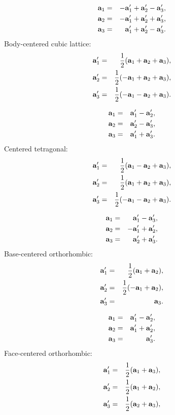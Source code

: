 \documentclass[12pt,a4paper]{article}
\begin{document}
\begin{eqnarray}
{\bf a}_1&=& -{\bf a}_1' + {\bf a}_2'- {\bf a}_3', \\
{\bf a}_2&=& -{\bf a}_1' + {\bf a}_2'+ {\bf a}_3', \\
{\bf a}_3&=& {\bf a}_1' + {\bf a}_2'- {\bf a}_3' .
\end{eqnarray}
Body-centered cubic lattice:
\begin{eqnarray}
{\bf a}_1'&=&{1\over 2} ({\bf a}_1 + {\bf a}_2 + {\bf a}_3), \\
{\bf a}_2'&=&{1\over 2} (-{\bf a}_1 + {\bf a}_2 + {\bf a}_3), \\
{\bf a}_3'&=&{1\over 2} (-{\bf a}_1 - {\bf a}_2 + {\bf a}_3). 
\end{eqnarray}

\begin{eqnarray}
{\bf a}_1&=&  {\bf a}_1' - {\bf a}_2', \\
{\bf a}_2&=&  {\bf a}_2' - {\bf a}_3', \\
{\bf a}_3&=& {\bf a}_1' + {\bf a}_3'.
\end{eqnarray}
Centered tetragonal:
\begin{eqnarray}
{\bf a}_1'&=&{1\over 2} ({\bf a}_1 - {\bf a}_2 + {\bf a}_3), \\
{\bf a}_2'&=&{1\over 2} ({\bf a}_1 + {\bf a}_2 + {\bf a}_3), \\
{\bf a}_3'&=&{1\over 2} (-{\bf a}_1 - {\bf a}_2 + {\bf a}_3). 
\end{eqnarray}

\begin{eqnarray}
{\bf a}_1&=&  {\bf a}_1' - {\bf a}_3', \\
{\bf a}_2&=& -{\bf a}_1' + {\bf a}_2', \\
{\bf a}_3&=& {\bf a}_2' + {\bf a}_3'.
\end{eqnarray}
Base-centered orthorhombic:
\begin{eqnarray}
{\bf a}_1'&=&{1\over 2} ({\bf a}_1 + {\bf a}_2), \\
{\bf a}_2'&=&{1\over 2} (-{\bf a}_1 + {\bf a}_2), \\
{\bf a}_3'&=&{\bf a}_3. 
\end{eqnarray}

\begin{eqnarray}
{\bf a}_1&=&  {\bf a}_1' - {\bf a}_2', \\
{\bf a}_2&=&  {\bf a}_1' + {\bf a}_2', \\
{\bf a}_3&=& {\bf a}_3'.
\end{eqnarray}
Face-centered orthorhombic:
\begin{eqnarray}
{\bf a}_1'&=&{1\over 2} ({\bf a}_1 + {\bf a}_3), \\
{\bf a}_2'&=&{1\over 2} ({\bf a}_1 + {\bf a}_2), \\
{\bf a}_3'&=&{1\over 2} ({\bf a}_2 + {\bf a}_3), \\
\end{eqnarray}
\end{document}
